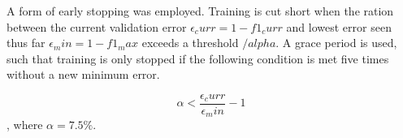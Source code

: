 \documentclass[conference]{IEEEtran}
\begin{document}
A form of early stopping was employed. Training is cut short when the ration between the current validation error $\epsilon_curr = 1 - f1_curr$ and lowest error seen thus far $\epsilon_min = 1 - f1_max$ exceeds a threshold $/alpha$. A grace period is used, such that training is only stopped if the following condition is met five times without a new minimum error. 

$$ \alpha < \frac{\epsilon_curr}{\epsilon_min} - 1$$,
where $\alpha = 7.5\%$.













\end{document}
